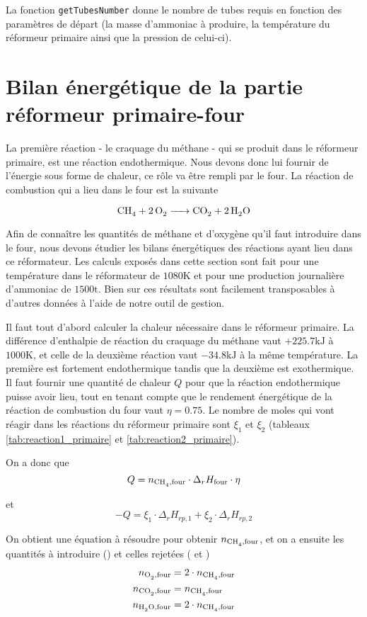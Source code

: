 La fonction \texttt{getTubesNumber} donne le
nombre de tubes requis en fonction des paramètres de départ (la masse d'ammoniac 
à produire, la température du réformeur primaire ainsi que la pression de celui-ci).

\section{Bilan énergétique de la partie réformeur primaire-four}

La première réaction - le craquage du méthane - qui se produit dans le réformeur primaire,
est une réaction endothermique. Nous devons donc lui fournir de l'énergie sous 
forme de chaleur, ce r\^ole va être rempli par le four. 
La réaction de combustion qui a lieu dans le four est la suivante

\[
	\ce{CH4 + 2O2 -> CO2 + 2H2O}
\]

Afin de connaître les quantités de méthane et d'oxygène qu'il faut
introduire dans le four, nous devons étudier les bilans énergétiques
des réactions ayant lieu dans ce réformateur. Les calculs exposés dans cette section 
sont fait pour une température dans le réformateur de $1080 \si{\kelvin}$
et pour une production journalière d'ammoniac de $1500 \si{\tonne}$. 
Bien sur ces résultats sont facilement transposables
à d'autres données à l'aide de notre outil de gestion.

Il faut tout d'abord calculer la chaleur nécessaire dans le réformeur primaire.
La différence d'enthalpie de réaction du craquage du méthane vaut $+225.7 \si{\kilo\joule}$
à $1000 \si{\kelvin}$, et celle de la deuxième réaction
vaut $-34.8 \si{\kilo\joule}$ à la même température.
La première est fortement endothermique tandis que la deuxième est exothermique.
Il faut fournir une quantité de chaleur $Q$ pour que la réaction endothermique
puisse avoir lieu, tout en tenant compte que le rendement énergétique de 
la réaction de combustion du four vaut $\eta = 0.75$.
Le nombre de moles qui vont réagir dans les réactions du réformeur primaire 
sont $\xi_1$ et $\xi_2$ (tableaux \ref{tab:reaction1_primaire} 
et \ref{tab:reaction2_primaire}).

On a donc que 
\[
	Q = n_{\ce{CH4},\text{four}} \cdot \Delta_r H_{\text{four}} \cdot \eta
\]

et 
\[
	-Q = \xi_1 \cdot \Delta_r H_{rp,1} + \xi_2 \cdot \Delta_r H_{rp,2}
\]

On obtient une équation à résoudre pour obtenir $n_{\ce{CH4},\text{four}}$, et on a ensuite
les quantités à introduire () et celles rejetées ( et )
\begin{align*}
	n_{\ce{O2},\text{four}} &= 2 \cdot n_{\ce{CH4},\text{four}} \\
	n_{\ce{CO2},\text{four}} &= n_{\ce{CH4},\text{four}} \\
	n_{\ce{H2O},\text{four}} &= 2 \cdot n_{\ce{CH4},\text{four}}
\end{align*}

